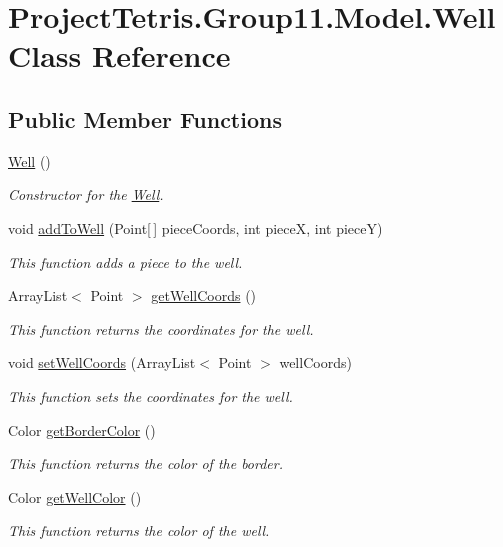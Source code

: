 \hypertarget{class_project_tetris_1_1_group11_1_1_model_1_1_well}{}\section{Project\+Tetris.\+Group11.\+Model.\+Well Class Reference}
\label{class_project_tetris_1_1_group11_1_1_model_1_1_well}
\subsection*{Public Member Functions}
\begin{DoxyCompactItemize}
\item 
\hyperlink{class_project_tetris_1_1_group11_1_1_model_1_1_well_ad2e8ce275ae537968a865f4bc4353455}{Well} ()
\begin{DoxyCompactList}\small\item\em Constructor for the \hyperlink{class_project_tetris_1_1_group11_1_1_model_1_1_well}{Well}. \end{DoxyCompactList}\item 
void \hyperlink{class_project_tetris_1_1_group11_1_1_model_1_1_well_a2b6fbb33b9636deb0389481b90ad6ac3}{add\+To\+Well} (Point\mbox{[}$\,$\mbox{]} piece\+Coords, int pieceX, int pieceY)
\begin{DoxyCompactList}\small\item\em This function adds a piece to the well. \end{DoxyCompactList}\item 
Array\+List$<$ Point $>$ \hyperlink{class_project_tetris_1_1_group11_1_1_model_1_1_well_a16f565cb48b17ea4df866b05a2ea3b36}{get\+Well\+Coords} ()
\begin{DoxyCompactList}\small\item\em This function returns the coordinates for the well. \end{DoxyCompactList}\item 
void \hyperlink{class_project_tetris_1_1_group11_1_1_model_1_1_well_a0d596baf44d364cba8a4f457d064c8cf}{set\+Well\+Coords} (Array\+List$<$ Point $>$ well\+Coords)
\begin{DoxyCompactList}\small\item\em This function sets the coordinates for the well. \end{DoxyCompactList}\item 
Color \hyperlink{class_project_tetris_1_1_group11_1_1_model_1_1_well_a7f4f1bd6f6f38f6c3178dd86d0f8b7b9}{get\+Border\+Color} ()
\begin{DoxyCompactList}\small\item\em This function returns the color of the border. \end{DoxyCompactList}\item 
Color \hyperlink{class_project_tetris_1_1_group11_1_1_model_1_1_well_a587848104b6b00ef0e953e5d43fd4e62}{get\+Well\+Color} ()
\begin{DoxyCompactList}\small\item\em This function returns the color of the well. \end{DoxyCompactList}\end{DoxyCompactItemize}


